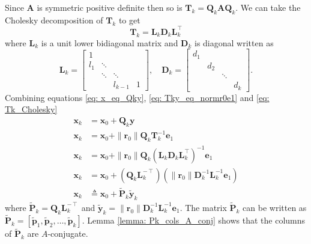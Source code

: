 Since $\bm{A}$ is symmetric positive definite then so is $\bm{T}_k  = \bm{Q}_k \bm{A} \bm{Q}_k$. We can take the Cholesky decomposition of $\bm{T}_k$ to get
\begin{equation} \label{eq: Tk_Cholesky}
    \bm{T}_k = \bm{L}_k \bm{D}_k \bm{L}_k^{\intercal}
\end{equation}
where $\bm{L}_k$ is a unit lower bidiagonal matrix and $\bm{D}_k$ is diagonal written as
\[
    \bm{L}_k =
    \begin{bmatrix}
        1   &        &         &   \\
        l_1 & \ddots &         &   \\
            & \ddots & \ddots  &   \\
            &        & l_{k-1} & 1
    \end{bmatrix}, \quad
    \bm{D}_k =
    \begin{bmatrix}
        d_1 &     &        &     \\
            & d_2 &        &     \\
            &     & \ddots &     \\
            &     &        & d_k
    \end{bmatrix}.
\]
Combining equations \ref{eq: x_eq_Qky}, \ref{eq: Tky_eq_normr0e1} and \ref{eq: Tk_Cholesky}
\begin{align*}
    \bm{x}_k & = \bm{x}_0 + \bm{Q}_k \bm{y}                                                                                                  \\
    \bm{x}_k & = \bm{x}_0 + \| \bm{r}_0 \| \bm{Q}_k \bm{T}_k^{-1} \bm{e}_1                                                                   \\
    \bm{x}_k & = \bm{x}_0 + \| \bm{r}_0 \| \bm{Q}_k \left( \bm{L}_k \bm{D}_k \bm{L}_k^{\intercal} \right)^{-1} \bm{e}_1                      \\
    \bm{x}_k & = \bm{x}_0 + \left( \bm{Q}_k \bm{L}_k^{-\intercal} \right) \left( \| \bm{r}_0 \| \bm{D}_k^{-1} \bm{L}_k^{-1} \bm{e}_1 \right) \\
    \bm{x}_k & \triangleq \bm{x}_0 + \tilde{\bm{P}}_k \tilde{\bm{y}}_k
\end{align*}
where $\tilde{\bm{P}}_k = \bm{Q}_k \bm{L}_k^{-\intercal}$ and $\tilde{\bm{y}}_k = \| \bm{r}_0 \| \bm{D}_k^{-1} \bm{L}_k^{-1} \bm{e}_1$. The matrix $\tilde{\bm{P}}_k$ can be written as
$\tilde{\bm{P}}_k = \left[ \tilde{\bm{p}}_1 , \tilde{\bm{p}}_2 , \ldots , \tilde{\bm{p}}_k \right]$. Lemma \ref{lemma: Pk_cols_A_conj} shows that the columns of $\tilde{\bm{P}}_k$ are $A$-conjugate.

